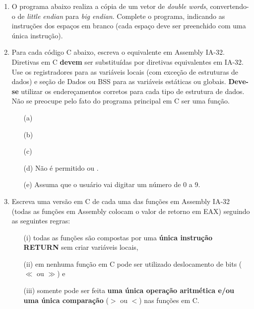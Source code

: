 \begin{enumerate}[resume]

    \item
    O programa abaixo realiza a cópia de um vetor de \textit{double words}, 
    convertendo-o de \textit{little endian} para \textit{big endian}.
    Complete o programa, indicando as instruções dos espaços em branco 
    (cada espaço deve ser preenchido com uma única instrução).

    \item
    Para cada código C abaixo, escreva o equivalente em Assembly IA-32.
    Diretivas em C \textbf{devem} ser substituídas por diretivas equivalentes em IA-32.
    Use os registradores para as variáveis locais (com exceção de estruturas de dados)
    e seção de Dados ou BSS para as variáveis estáticas ou globais.
    \textbf{Deve-se} utilizar os endereçamentos corretos 
    para cada tipo de estrutura de dados.
    Não se preocupe pelo fato do programa principal em C ser uma função.
    \begin{itemize}
        \item [(a)] 
        \item [(b)] 
        \item [(c)] 
        \item [(d)] Não é permitido  ou .
        \item [(e)] Assuma que o usuário vai digitar um número de 0 a 9.
    \end{itemize}

    \item
    Escreva uma versão em C de cada uma das funções em Assembly IA-32
    (todas as funções em Assembly colocam o valor de retorno em EAX)
    seguindo as seguintes regras:
    \begin{enumerate}
        \item [(i)]
        todas as funções são compostas por uma \textbf{única instrução RETURN}
        sem criar variáveis locais,
        
        \item [(ii)]
        em nenhuma função em C pode ser utilizado deslocamento de bits 
        ($\ll$ ou $\gg$) e

        \item [(iii)]
        somente pode ser feita \textbf{uma única operação aritmética 
        e/ou uma única comparação} ($>$ ou $<$) nas funções em C.
    \end{enumerate}


\end{enumerate}

